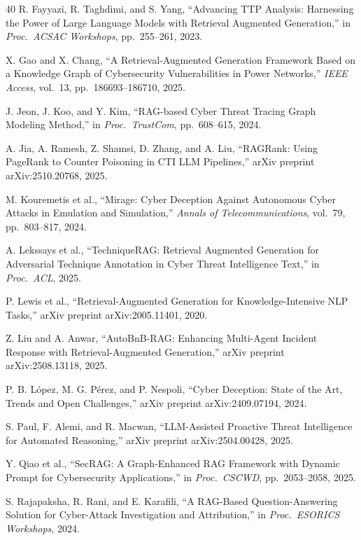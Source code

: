 \begin{thebibliography}{40}
 R. Fayyazi, R. Taghdimi, and S. Yang, ``Advancing TTP Analysis: Harnessing the Power of Large Language Models with Retrieval Augmented Generation,'' in \emph{Proc.\ ACSAC Workshops}, pp.~255--261, 2023.

 X. Gao and X. Chang, ``A Retrieval-Augmented Generation Framework Based on a Knowledge Graph of Cybersecurity Vulnerabilities in Power Networks,'' \emph{IEEE Access}, vol.~13, pp.~186693--186710, 2025.

 J. Jeon, J. Koo, and Y. Kim, ``RAG-based Cyber Threat Tracing Graph Modeling Method,'' in \emph{Proc.\ TrustCom}, pp.~608--615, 2024.

 A. Jia, A. Ramesh, Z. Shamsi, D. Zhang, and A. Liu, ``RAGRank: Using PageRank to Counter Poisoning in CTI LLM Pipelines,'' arXiv preprint arXiv:2510.20768, 2025.

 M. Kouremetis et al., ``Mirage: Cyber Deception Against Autonomous Cyber Attacks in Emulation and Simulation,'' \emph{Annals of Telecommunications}, vol.~79, pp.~803--817, 2024.

 A. Lekssays et al., ``TechniqueRAG: Retrieval Augmented Generation for Adversarial Technique Annotation in Cyber Threat Intelligence Text,'' in \emph{Proc.\ ACL}, 2025.

 P. Lewis et al., ``Retrieval-Augmented Generation for Knowledge-Intensive NLP Tasks,'' arXiv preprint arXiv:2005.11401, 2020.

 Z. Liu and A. Anwar, ``AutoBnB-RAG: Enhancing Multi-Agent Incident Response with Retrieval-Augmented Generation,'' arXiv preprint arXiv:2508.13118, 2025.

 P. B. L\'opez, M. G. P\'erez, and P. Nespoli, ``Cyber Deception: State of the Art, Trends and Open Challenges,'' arXiv preprint arXiv:2409.07194, 2024.

 S. Paul, F. Alemi, and R. Macwan, ``LLM-Assisted Proactive Threat Intelligence for Automated Reasoning,'' arXiv preprint arXiv:2504.00428, 2025.

 Y. Qiao et al., ``SecRAG: A Graph-Enhanced RAG Framework with Dynamic Prompt for Cybersecurity Applications,'' in \emph{Proc.\ CSCWD}, pp.~2053--2058, 2025.

 S. Rajapaksha, R. Rani, and E. Karafili, ``A RAG-Based Question-Answering Solution for Cyber-Attack Investigation and Attribution,'' in \emph{Proc.\ ESORICS Workshops}, 2024.


\end{thebibliography}
